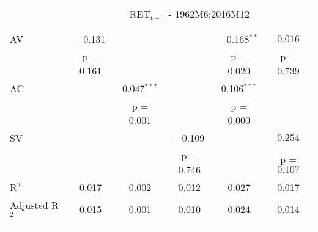 
\begin{tabular}{@{\extracolsep{5pt}}lccccc} 
& \multicolumn{5}{c}{RET$_{t+1}$ - 1962M6:2016M12} \\ 
\\[-1.8ex]
\hline \\[-1.8ex] 
 AV & $-$0.131 &  &  & $-$0.168$^{**}$ & $0.016$ \\ 
  & p = 0.161 &  &  & p = 0.020 & p = 0.739 \\ 
 AC &  & 0.047$^{***}$ &  & 0.106$^{***}$ &  \\ 
  &  & p = 0.001 &  & p = 0.000 &  \\ 
 SV &  &  & $-$0.109 &  & $0.254$ \\ 
  &  &  & p = 0.746 &  & p = $0.107$ \\ 
R$^{2}$ & 0.017 & 0.002 & 0.012 & 0.027 & 0.017 \\ 
Adjusted R$^{2}$ & 0.015 & 0.001 & 0.010 & 0.024 & 0.014 \\ 
\hline \\[-1.8ex] 
\end{tabular} 
